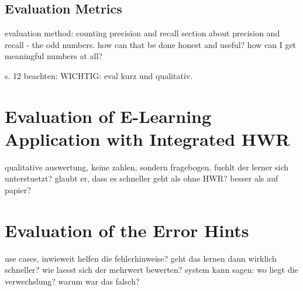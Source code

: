 \subsection{ Evaluation Metrics }
evaluation method: counting precision and recall
section about precision and recall - the odd numbers.
how can that be done honest and useful?
how can I get meaningful numbers at all?

s. 12 beachten: WICHTIG: eval kurz und qualitativ.

\section{Evaluation of E-Learning Application with Integrated HWR}
qualitative auswertung, keine zahlen, sondern fragebogen.
fuehlt der lerner sich unterstuetzt? glaubt er, dass es schneller geht als ohne 
HWR? 
besser als auf papier?

\section{Evaluation of the Error Hints}
use cases, inwieweit helfen die fehlerhinweise?
geht das lernen dann wirklich schneller?
wie laesst sich der mehrwert bewerten?
system kann sagen: wo liegt die verwechslung? warum war das falsch?


